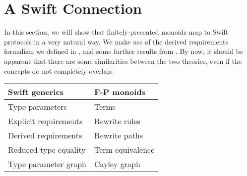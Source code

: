 \documentclass[../generics]{subfiles}
\begin{document}
\section{A Swift Connection}\label{monoidsasprotocols}

In this section, we will show that finitely-presented monoids map to Swift protocols in a very natural way. We make use of the derived requirements formalism we defined in , and some further results from . By now, it should be apparent that there are some similarities between the two theories, even if the concepts do not completely overlap:
\begin{center}
\begin{tabular}{ll}
\toprule
\textbf{Swift generics}&\textbf{F-P monoids}\\
\midrule
Type parameters&Terms\\
Explicit requirements&Rewrite rules\\
Derived requirements&Rewrite paths\\
Reduced type equality&Term equivalence\\
\index{type parameter graph}Type parameter graph&\index{Cayley graph}Cayley graph\\
\bottomrule
\end{tabular}
\end{center}

\newcommand{\GM}{G_\texttt{M}}
\end{document}

